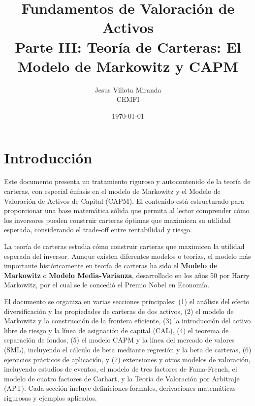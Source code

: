 

\title{\textbf{Fundamentos de Valoración de Activos}\\
\large Parte III: Teoría de Carteras: El Modelo de Markowitz y CAPM}
\author{Jesus Villota Miranda\\
CEMFI}
\date{\today}



\maketitle

\tableofcontents
\newpage

\section{Introducción}

Este documento presenta un tratamiento riguroso y autocontenido de la teoría de carteras, con especial énfasis en el modelo de Markowitz y el Modelo de Valoración de Activos de Capital (CAPM). El contenido está estructurado para proporcionar una base matemática sólida que permita al lector comprender cómo los inversores pueden construir carteras óptimas que maximicen su utilidad esperada, considerando el trade-off entre rentabilidad y riesgo.

La teoría de carteras estudia cómo construir carteras que maximicen la utilidad esperada del inversor. Aunque existen diferentes modelos o teorías, el modelo más importante históricamente en teoría de carteras ha sido el \textbf{Modelo de Markowitz} o \textbf{Modelo Media-Varianza}, desarrollado en los años 50 por Harry Markowitz, por el cual se le concedió el Premio Nobel en Economía.

El documento se organiza en varias secciones principales: (1) el análisis del efecto diversificación y las propiedades de carteras de dos activos, (2) el modelo de Markowitz y la construcción de la frontera eficiente, (3) la introducción del activo libre de riesgo y la línea de asignación de capital (CAL), (4) el teorema de separación de fondos, (5) el modelo CAPM y la línea del mercado de valores (SML), incluyendo el cálculo de beta mediante regresión y la beta de carteras, (6) ejercicios prácticos de aplicación, y (7) extensiones y otros modelos de valoración, incluyendo estudios de eventos, el modelo de tres factores de Fama-French, el modelo de cuatro factores de Carhart, y la Teoría de Valoración por Arbitraje (APT). Cada sección incluye definiciones formales, derivaciones matemáticas rigurosas y ejemplos aplicados.

